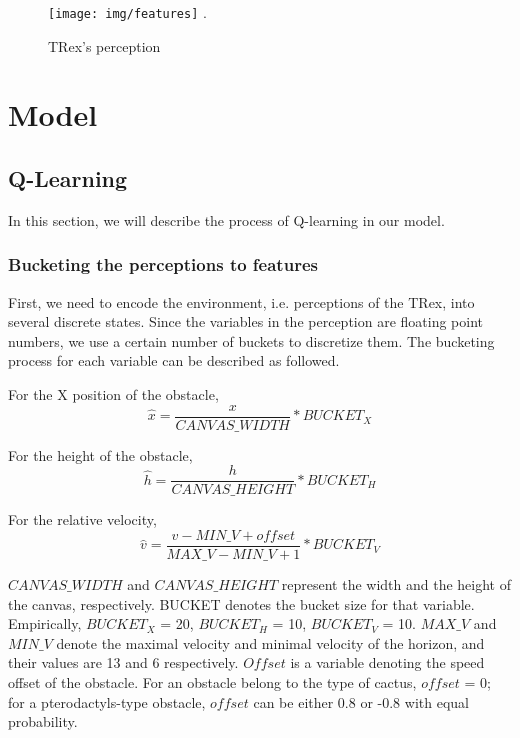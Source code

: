 \documentclass[conference]{IEEEtran}
\begin{document}
\begin{figure}[ht]
\centering
\texttt{[image: img/features]}
\DeclareGraphicsExtensions.
\caption{TRex's perception}
\label{fig:features}
\end{figure}

\section{Model}
\subsection{Q-Learning}
In this section, we will describe the process of Q-learning in our model. 

\subsubsection{Bucketing the perceptions to features}

First, we need to encode the environment, i.e. perceptions of the TRex, into several discrete states. Since the variables in the perception are floating point numbers, we use a certain number of buckets to discretize them. The bucketing process for each variable can be described as followed.

For the X position of the obstacle,
\begin{equation}
    \hat{x}=\frac{x}{CANVAS\_WIDTH} * BUCKET_X
    \label{eq:x_bucket}
\end{equation}

For the height of the obstacle,
\begin{equation}
    \hat{h}=\frac{h}{CANVAS\_HEIGHT} * BUCKET_H
    \label{eq:h_bucket}
\end{equation}

For the relative velocity,
\begin{equation}
    \hat{v}=\frac{v - MIN\_V + offset}{MAX\_V - MIN\_V + 1} * BUCKET_V
    \label{eq:v_bucket}
\end{equation}

$CANVAS\_WIDTH$ and $CANVAS\_HEIGHT$ represent the width and the height of the canvas, respectively. BUCKET denotes the bucket size for that variable. Empirically, ${BUCKET}_{X}$ = 20, ${BUCKET}_{{H}}$ = 10, ${BUCKET}_{{V}}$ = 10. $MAX\_V$ and $MIN\_V$ denote the maximal velocity and minimal velocity of the horizon, and their values are 13 and 6 respectively. $Offset$ is a variable denoting the speed offset of the obstacle. For an obstacle belong to the type of cactus, $offset$ = 0; for a pterodactyls-type obstacle, $offset$ can be either 0.8 or -0.8 with equal probability.
\end{document}
